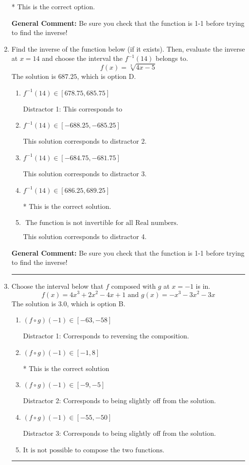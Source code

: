 \documentclass{extbook}[14pt]
\newcommand{\litem}[1]{\item #1

\rule{\textwidth}{0.4pt}}
\begin{document}
\begin{enumerate}
{\begin{enumerate}[label=\Alph*.]
* This is the correct option.
\end{enumerate}

\textbf{General Comment:} Be sure you check that the function is 1-1 before trying to find the inverse!
}
\litem{
Find the inverse of the function below (if it exists). Then, evaluate the inverse at $x = 14$ and choose the interval the $f^{-1}(14)$ belongs to.
\[ f(x) = \sqrt[3]{4 x - 5} \]The solution is \( 687.25 \), which is option D.\begin{enumerate}[label=\Alph*.]
\item \( f^{-1}(14) \in [678.75, 685.75] \)

 Distractor 1: This corresponds to 
\item \( f^{-1}(14) \in [-688.25, -685.25] \)

 This solution corresponds to distractor 2.
\item \( f^{-1}(14) \in [-684.75, -681.75] \)

 This solution corresponds to distractor 3.
\item \( f^{-1}(14) \in [686.25, 689.25] \)

* This is the correct solution.
\item \( \text{ The function is not invertible for all Real numbers. } \)

 This solution corresponds to distractor 4.
\end{enumerate}

\textbf{General Comment:} Be sure you check that the function is 1-1 before trying to find the inverse!
}
\litem{
Choose the interval below that $f$ composed with $g$ at $x=-1$ is in.
\[ f(x) = 4x^{3} +2 x^{2} -4 x + 1 \text{ and } g(x) = -x^{3} -3 x^{2} -3 x \]The solution is \( 3.0 \), which is option B.\begin{enumerate}[label=\Alph*.]
\item \( (f \circ g)(-1) \in [-63, -58] \)

 Distractor 1: Corresponds to reversing the composition.
\item \( (f \circ g)(-1) \in [-1, 8] \)

* This is the correct solution
\item \( (f \circ g)(-1) \in [-9, -5] \)

 Distractor 2: Corresponds to being slightly off from the solution.
\item \( (f \circ g)(-1) \in [-55, -50] \)

 Distractor 3: Corresponds to being slightly off from the solution.
\item \( \text{It is not possible to compose the two functions.} \)



\end{enumerate}}
\end{enumerate}
\end{document}
